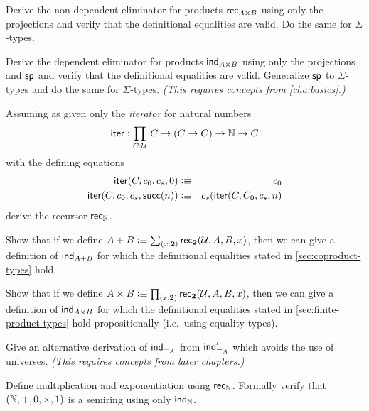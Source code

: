 \begin{ex}
Derive the non-dependent eliminator for products $\mathsf{rec}_{A\times B} $ using only the projections and verify that the definitional equalities are valid. Do the same for $\Sigma$-types.
\end{ex}

\begin{ex}
  Derive the dependent eliminator for products $\mathsf{ind}_{A\times B}$ using only the projections and $\mathsf{sp}$ and verify that the definitional equalities are valid. Generalize $\mathsf{sp}$ to $\Sigma$-types and do the same for $\Sigma$-types.
  \emph{(This requires concepts from \autoref{cha:basics}.)}
\end{ex}

\begin{ex}
Assuming as given only the \emph{iterator} for natural numbers
\[\ite : \prd{C:\UU} C \to (C \to C) \to \nat \to C \]
with the defining equations
\begin{eqnarray*}
\mathsf{iter}(C,c_0,c_s,0)  & \vcentcolon\equiv & c_0 \\
\mathsf{iter}(C,c_0,c_s,\mathsf{succ}(n)) & \vcentcolon\equiv & c_s(\mathsf{iter}(C,C_0,c_s,n)  
\end{eqnarray*}
derive the recursor $\mathsf{rec}_{\mathbb{N}}$.
\end{ex}

\begin{ex}\label{ex:sum-via-bool}
Show that if we define $A + B \defeq \sm{x:\bool} \rec{\bool}(\UU,A,B,x)$, then we can give a definition of $\mathsf{ind}_{A+B}$ for which the definitional equalities stated in \autoref{sec:coproduct-types} hold.
\end{ex}

\begin{ex}\label{ex:prod-via-bool}
Show that if we define $A \times B \defeq \prd{x:\bool}\rec{\bool}(\UU,A,B,x)$, then we can give a definition of  $\mathsf{ind}_{A\times B}$ for which the definitional equalities stated in \autoref{sec:finite-product-types} hold propositionally (i.e.\ using equality types).
\end{ex}

\begin{ex}\label{ex:pm-to-ml}
Give an alternative derivation of $\mathsf{ind}_{=_{A}}$ from $\mathsf{ind}_{=_{A}}'$ which avoids the use of universes.
  \emph{(This requires concepts from later chapters.)}
\end{ex}

\begin{ex}
Define multiplication and exponentiation using $\mathsf{rec}_{\mathbb{N}}$. Formally verify that $(\mathbb{N},+,0,\times,1)$ is a semiring using only $\mathsf{ind}_{\mathbb{N}}$.  
\end{ex}

